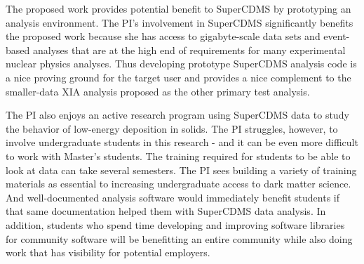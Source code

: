 The proposed work provides potential benefit to SuperCDMS by prototyping an analysis environment.  The PI's involvement in SuperCDMS significantly benefits the proposed work because she has access to gigabyte-scale data sets and event-based analyses that are at the high end of requirements for many experimental nuclear physics analyses.  Thus developing prototype SuperCDMS analysis code is a nice proving ground for the target user and provides a nice complement to the smaller-data XIA analysis proposed as the other primary test analysis.

The PI also enjoys an active research program using SuperCDMS data to study the behavior of low-energy deposition in solids.  The PI struggles, however, to involve undergraduate students in this research - and it can be even more difficult to work with Master's students.  The training required for students to be able to look at data can take several semesters.  The PI sees building a variety of training materials as essential to increasing undergraduate access to dark matter science.  And well-documented analysis software would immediately benefit students if that same documentation helped them with SuperCDMS data analysis.  In addition, students who spend time developing and improving software libraries for community software will be benefitting an entire community while also doing work that has visibility for potential employers.


 
 
